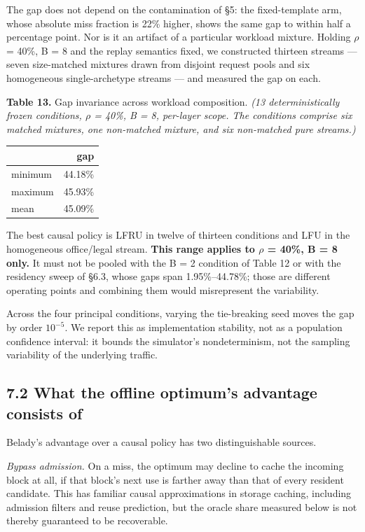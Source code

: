 \documentclass[
  10pt,
  letterpaper,
  10pt]{article}
\newcounter{none} %
\begin{document}
The gap does not depend on the contamination of §5: the fixed-template
arm, whose absolute miss fraction is 22\% higher, shows the same gap to
within half a percentage point. Nor is it an artifact of a particular
workload mixture. Holding \ensuremath{\rho} = 40\%, B = 8 and the replay
semantics fixed, we constructed thirteen streams --- seven size-matched
mixtures drawn from disjoint request pools and six homogeneous
single-archetype streams --- and measured the gap on each.

\textbf{Table 13.} Gap invariance across workload composition. \emph{(13
deterministically frozen conditions, \ensuremath{\rho} = 40\%, B = 8,
per-layer scope. The conditions comprise six matched mixtures, one
non-matched mixture, and six non-matched pure streams.)}

{\def\LTcaptype{none} %
\begin{longtable}[]{@{}lr@{}}
\toprule\noalign{}
& gap \\
\midrule\noalign{}
\endhead
\bottomrule\noalign{}
\endlastfoot
minimum & 44.18\% \\
maximum & 45.93\% \\
mean & 45.09\% \\
\end{longtable}
}

The best causal policy is LFRU in twelve of thirteen conditions and LFU
in the homogeneous office/legal stream. \textbf{This range applies to
\ensuremath{\rho} = 40\%, B = 8 only.} It must not be pooled with the B
= 2 condition of Table 12 or with the residency sweep of §6.3, whose
gaps span 1.95\%--44.78\%; those are different operating points and
combining them would misrepresent the variability.

Across the four principal conditions, varying the tie-breaking seed
moves the gap by order \ensuremath{10^{-5}}. We report this as
implementation stability, not as a population confidence interval: it
bounds the simulator's nondeterminism, not the sampling variability of
the underlying traffic.

\subsection{7.2 What the offline optimum's advantage consists
of}\label{what-the-offline-optimums-advantage-consists-of}

Belady's advantage over a causal policy has two distinguishable sources.

\emph{Bypass admission.} On a miss, the optimum may decline to cache the
incoming block at all, if that block's next use is farther away than
that of every resident candidate. This has familiar causal
approximations in storage caching, including admission filters and reuse
prediction, but the oracle share measured below is not thereby
guaranteed to be recoverable.
\end{document}
